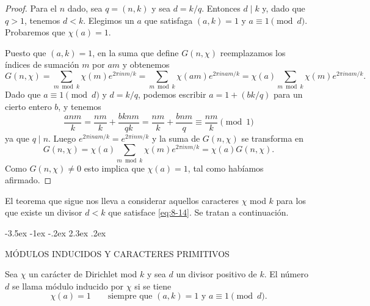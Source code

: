 \documentclass[12pt,a4paper]{book}
\makeatletter
\renewcommand\section{\@startsection{section}{1}{\z@}%
  {-3.5ex \@plus -1ex \@minus -.2ex}%
  {2.3ex \@plus .2ex}%
  {\normalfont\Large\bfseries\raggedright}}
\makeatother
\begin{document}
    \begin{proof}
        Para el $n$ dado, sea $q=(n,k)$ y sea $d=k/q$. Entonces $d\mid k$ y, dado que
        $q>1$, tenemos $d<k$. Elegimos un $a$ que satisfaga $(a,k)=1$ y
        $a\equiv1\pmod{d}$. Probaremos que $\chi(a)=1$.

        Puesto que $(a,k)=1$, en la suma que define $G(n,\chi)$ reemplazamos los índices de
        sumación $m$ por $am$ y obtenemos
        \begin{equation*}
            G(n,\chi)=\sum_{m\bmod k}\chi(m)e^{2\pi inm/k}=\sum_{m\bmod k}\chi(am)e^{2\pi inam/k}
            =\chi(a)\sum_{m\bmod k}\chi(m)e^{2\pi inam/k}.
        \end{equation*}
        Dado que $a\equiv1\pmod{d}$ y $d=k/q$, podemos escribir $a=1+(bk/q)$ para un cierto
        entero $b$, y tenemos
        \begin{equation*}
            \frac{anm}{k}=\frac{nm}{k}+\frac{bknm}{qk}=\frac{nm}{k}+\frac{bnm}{q}\equiv\frac{nm}{k}\pmod{1}
        \end{equation*}
        ya que $q\mid n$. Luego $e^{2\pi inam/k}=e^{2\pi inm/k}$ y la suma de $G(n,\chi)$ se
        transforma en
        \begin{equation*}
            G(n,\chi)=\chi(a)\sum_{m\bmod k}\chi(m)e^{2\pi inm/k}=\chi(a)G(n,\chi).
        \end{equation*}
        Como $G(n,\chi)\neq0$ esto implica que $\chi(a)=1$, tal como habíamos afirmado.
    \end{proof}

    El teorema que sigue nos lleva a considerar aquellos caracteres $\chi$ mod $k$ para los
    que existe un divisor $d<k$ que satisface \eqref{eq:8-14}. Se tratan a continuación.

    \section{MÓDULOS INDUCIDOS Y CARACTERES PRIMITIVOS}
    \begin{definicion}
        Sea $\chi$ un carácter de Dirichlet mod $k$ y sea $d$ un divisor positivo de $k$.
        El número $d$ se llama módulo inducido por $\chi$ si se tiene
        \begin{equation}\label{eq:8-15}
            \chi(a)=1\qquad\text{siempre que }(a,k)=1\text{ y }a\equiv1\pmod{d}.
        \end{equation}
    \end{definicion}
\end{document}
